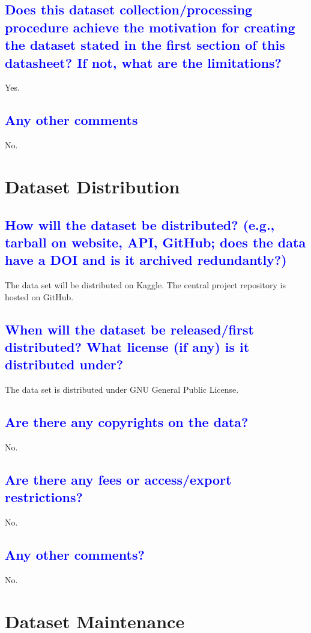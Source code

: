 \documentclass[letterpaper, 10 pt, conference]{ieeeconf}  %
\begin{document}
{{\textcolor{blue}{\subsection{Does this dataset collection/processing procedure
achieve the motivation for creating the dataset
stated in the first section of this datasheet? If not,
what are the limitations?}}
Yes.


\textcolor{blue}{\subsection{Any other comments}}
No.

\section{Dataset Distribution}

\textcolor{blue}{\subsection{How will the dataset be distributed? (e.g., tarball on
website, API, GitHub; does the data have a DOI and is it
archived redundantly?)}}
The data set will be distributed on Kaggle. The central project repository is hosted on GitHub.


\textcolor{blue}{\subsection{When will the dataset be released/first distributed?
What license (if any) is it distributed under?}}
The data set is distributed under GNU General Public License.

\textcolor{blue}{\subsection{Are there any copyrights on the data?}}
No.


\textcolor{blue}{\subsection{Are there any fees or access/export restrictions?}}
No.

\textcolor{blue}{\subsection{Any other comments?}}
No.

\section{Dataset Maintenance}

}}
\end{document}
